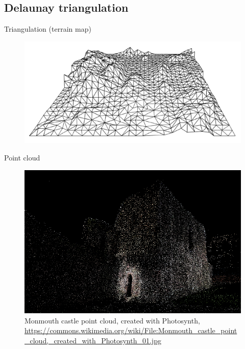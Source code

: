 \subsection{Delaunay triangulation}
\begin{frame}{Triangulation (terrain map)}
\begin{figure}
    \centering
    \includegraphics[width=\textwidth]{figs/L07-terrain-map.png}
\end{figure}

\end{frame}


\begin{frame}{Point cloud}
\begin{figure}
    \centering
    \includegraphics[width=\textwidth]{figs/Monmouth_castle_point_cloud,_created_with_Photosynth_01.jpg}
    \caption{Monmouth castle point cloud, created with Photosynth, \url{https://commons.wikimedia.org/wiki/File:Monmouth_castle_point_cloud,_created_with_Photosynth_01.jpg}}
    \label{fig:my_label}
\end{figure}
    
\end{frame}

